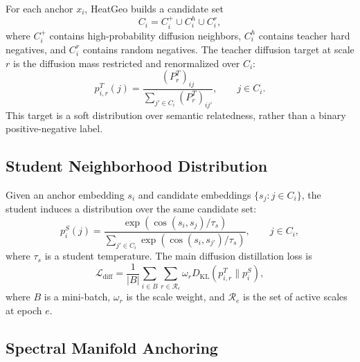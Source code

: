 For each anchor $x_i$, HeatGeo builds a candidate set
\begin{equation}
    C_i = C_i^{+} \cup C_i^{h} \cup C_i^{r},
\end{equation}
where $C_i^{+}$ contains high-probability diffusion neighbors, $C_i^{h}$ contains teacher hard negatives, and $C_i^{r}$ contains random negatives. The teacher diffusion target at scale $r$ is the diffusion mass restricted and renormalized over $C_i$:
\begin{equation}
    p_{i,r}^{T}(j)
    =
    \frac{(P_r^T)_{ij}}
    {\sum_{j' \in C_i}(P_r^T)_{ij'}},
    \qquad j\in C_i.
\end{equation}
This target is a soft distribution over semantic relatedness, rather than a binary positive-negative label.

\subsection{Student Neighborhood Distribution}

Given an anchor embedding $s_i$ and candidate embeddings $\{s_j:j\in C_i\}$, the student induces a distribution over the same candidate set:
\begin{equation}
    p_i^{S}(j)
    =
    \frac{\exp(\cos(s_i,s_j)/\tau_s)}
    {\sum_{j'\in C_i}\exp(\cos(s_i,s_{j'})/\tau_s)},
    \qquad j\in C_i,
\end{equation}
where $\tau_s$ is a student temperature. The main diffusion distillation loss is
\begin{equation}
    \mathcal{L}_{\mathrm{diff}}
    =
    \frac{1}{|B|}
    \sum_{i\in B}
    \sum_{r\in\mathcal{R}_{e}}
    \omega_r
    D_{\mathrm{KL}}
    \left(
        p_{i,r}^{T} \| p_i^{S}
    \right),
\end{equation}
where $B$ is a mini-batch, $\omega_r$ is the scale weight, and $\mathcal{R}_{e}$ is the set of active scales at epoch $e$.

\subsection{Spectral Manifold Anchoring}


